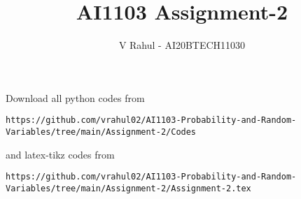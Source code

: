 \documentclass[journal,12pt,twocolumn]{IEEEtran}
\DeclareMathOperator*{\Res}{Res}
\begin{document}
\newcommand{\BEQA}{\begin{eqnarray}}
\newcommand{\EEQA}{\end{eqnarray}}
\newcommand{\define}{\stackrel{\triangle}{=}}

\raggedbottom
\setlength{\parindent}{0pt}
\providecommand{\mbf}{\mathbf}
\providecommand{\pr}[1]{\ensuremath{\Pr\left(#1\right)}}
\providecommand{\qfunc}[1]{\ensuremath{Q\left(#1\right)}}
\providecommand{\sbrak}[1]{\ensuremath{{}\left[#1\right]}}
\providecommand{\lsbrak}[1]{\ensuremath{{}\left[#1\right.}}
\providecommand{\rsbrak}[1]{\ensuremath{{}\left.#1\right]}}
\providecommand{\brak}[1]{\ensuremath{\left(#1\right)}}
\providecommand{\lbrak}[1]{\ensuremath{\left(#1\right.}}
\providecommand{\rbrak}[1]{\ensuremath{\left.#1\right)}}
\providecommand{\cbrak}[1]{\ensuremath{\left\{#1\right\}}}
\providecommand{\lcbrak}[1]{\ensuremath{\left\{#1\right.}}
\providecommand{\rcbrak}[1]{\ensuremath{\left.#1\right\}}}
\theoremstyle{remark}
\newtheorem{rem}{Remark}
\newcommand{\sgn}{\mathop{\mathrm{sgn}}}
\providecommand{\abs}[1]{\vert#1\vert}
\providecommand{\res}[1]{\Res\displaylimits_{#1}} 
\providecommand{\norm}[1]{\lVert#1\rVert}
\providecommand{\mtx}[1]{\mathbf{#1}}
\providecommand{\mean}[1]{E[#1]}
\providecommand{\fourier}{\overset{\mathcal{F}}{ \rightleftharpoons}}
\providecommand{\system}{\overset{\mathcal{H}}{ \longleftrightarrow}}
\newcommand{\solution}{\noindent \textbf{Solution: }}
\newcommand{\cosec}{\,\text{cosec}\,}
\providecommand{\dec}[2]{\ensuremath{\overset{#1}{\underset{#2}{\gtrless}}}}
\newcommand{\myvec}[1]{\ensuremath{\begin{pmatrix}#1\end{pmatrix}}}
\newcommand{\mydet}[1]{\ensuremath{\begin{vmatrix}#1\end{vmatrix}}}
\makeatletter
{}
\makeatother
\let\StandardTheFigure\thefigure
\let\vec\mathbf
\renewcommand{\thefigure}{\theproblem}
\def\putbox#1#2#3{\makebox[0in][l]{\makebox[#1][l]{}\raisebox{\baselineskip}[0in][0in]{\raisebox{#2}[0in][0in]{#3}}}}
     \def\rightbox#1{\makebox[0in][r]{#1}}
     \def\centbox#1{\makebox[0in]{#1}}
     \def\topbox#1{\raisebox{-\baselineskip}[0in][0in]{#1}}
     \def\midbox#1{\raisebox{-0.5\baselineskip}[0in][0in]{#1}}
\vspace{3cm}
\title{AI1103 Assignment-2}
\author{V Rahul - AI20BTECH11030}
\maketitle
\newpage
\bigskip
\renewcommand{\thefigure}{\theenumi}
\renewcommand{\thetable}{\theenumi}
Download all python codes from 
\begin{lstlisting}
https://github.com/vrahul02/AI1103-Probability-and-Random-Variables/tree/main/Assignment-2/Codes
\end{lstlisting}
%
and latex-tikz codes from 
%
\begin{lstlisting}
https://github.com/vrahul02/AI1103-Probability-and-Random-Variables/tree/main/Assignment-2/Assignment-2.tex
\end{lstlisting}
\end{document}
